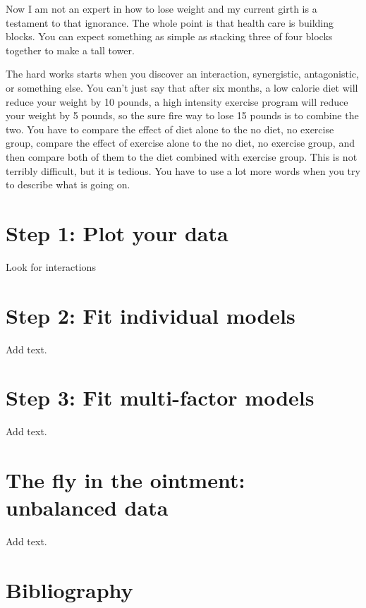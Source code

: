 \documentclass[
  letterpaper,
  DIV=11,
  numbers=noendperiod]{scrreprt}
\begin{document}
\begin{tcolorbox}
Now I am not an expert in how to lose weight and my current girth is a
testament to that ignorance. The whole point is that health care is
building blocks. You can expect something as simple as stacking three of
four blocks together to make a tall tower.

The hard works starts when you discover an interaction, synergistic,
antagonistic, or something else. You can't just say that after six
months, a low calorie diet will reduce your weight by 10 pounds, a high
intensity exercise program will reduce your weight by 5 pounds, so the
sure fire way to lose 15 pounds is to combine the two. You have to
compare the effect of diet alone to the no diet, no exercise group,
compare the effect of exercise alone to the no diet, no exercise group,
and then compare both of them to the diet combined with exercise group.
This is not terribly difficult, but it is tedious. You have to use a lot
more words when you try to describe what is going on.

\section{Step 1: Plot your data}\label{step-1-plot-your-data-1}

Look for interactions

\section{Step 2: Fit individual
models}\label{step-2-fit-individual-models}

Add text.

\section{Step 3: Fit multi-factor
models}\label{step-3-fit-multi-factor-models}

Add text.

\section{The fly in the ointment: unbalanced
data}\label{the-fly-in-the-ointment-unbalanced-data}

Add text.

\section{Bibliography}\label{bibliography-12}


\end{tcolorbox}
\end{document}
